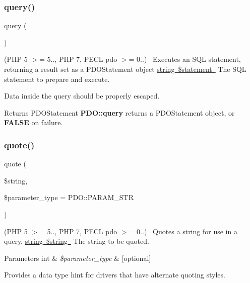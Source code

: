 \subsubsection{\texorpdfstring{query()}{query()}}
{\footnotesize\ttfamily query (\begin{DoxyParamCaption}{ }\end{DoxyParamCaption})}

(P\+HP 5 $>$= 5.., P\+HP 7, P\+E\+CL pdo $>$= 0..)~\newline
 Executes an S\+QL statement, returning a result set as a P\+D\+O\+Statement object \mbox{\hyperlink{}{string \$statement }} The S\+QL statement to prepare and execute. 

Data inside the query should be properly escaped. 

\begin{DoxyReturn}{Returns}
P\+D\+O\+Statement {\bfseries P\+D\+O\+::query} returns a P\+D\+O\+Statement object, or {\bfseries F\+A\+L\+SE} on failure. 
\end{DoxyReturn}
\mbox{\label{interface_pes_1_1_database_1_1_handler_1_1_mini_1_1_p_d_o_interface_a974d5921d0480c64f94c09994b8c0b48}} 
\subsubsection{\texorpdfstring{quote()}{quote()}}
{\footnotesize\ttfamily quote (\begin{DoxyParamCaption}\item[{}]{\$string,  }\item[{}]{\$parameter\+\_\+type = {\ttfamily PDO\+:\+:PARAM\+\_\+STR} }\end{DoxyParamCaption})}

(P\+HP 5 $>$= 5.., P\+HP 7, P\+E\+CL pdo $>$= 0..)~\newline
 Quotes a string for use in a query. \mbox{\hyperlink{}{string \$string }} The string to be quoted. 


\begin{DoxyParams}[1]{Parameters}
int & {\em \$parameter\+\_\+type} & \mbox{[}optional\mbox{]} \\
\hline
\end{DoxyParams}
Provides a data type hint for drivers that have alternate quoting styles. 

